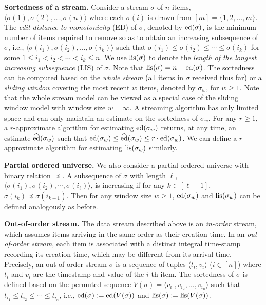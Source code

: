 \documentclass{llncs}
\newcommand{\runtitle}[1]{{\small \textbf{\boldmath #1}}}
\newcommand{\ed}{{\rm ed}}
\newcommand{\aed}{\widehat \ed}
\newcommand{\lis}{{\rm lis}}
\newcommand{\sw}{\sigma_w}
\begin{document}
\runtitle{Sortedness of a stream.}
Consider a stream $\sigma$ of $n$ items,
$\langle \sigma(1), \sigma(2), \dots, \sigma(n) \rangle$
where each $\sigma(i)$ is drawn
from $[m] = \{1, 2, \dots, m\}$.
The \emph{edit distance to monotonicity} (ED) of $\sigma$,
denoted by $\ed(\sigma)$,
is the minimum number of items required
to remove so as to obtain an increasing subsequence of $\sigma$,
i.e., $\langle \sigma(i_1), \sigma(i_2), \dots, \sigma(i_k) \rangle$
such that $\sigma(i_1) \le \sigma(i_2) \le \cdots \le \sigma(i_k)$
for some $1 \le i_1 < i_2 < \cdots < i_k \le n$.
We use $\lis(\sigma)$ to denote the
\emph{length of the longest increasing subsequence} (LIS) of $\sigma$.
Note that $\lis(\sigma) = n - \ed(\sigma)$.
The sortedness can be computed based
on the \emph{whole stream} (all items in $\sigma$ received thus far)
or a \emph{sliding window} covering the most recent $w$ items,
denoted by $\sw$, for $w \ge 1$.
Note that the whole stream model can be viewed as
a special case of the sliding window model with window size $w = \infty$.
A streaming algorithm has only limited space
and can only maintain an estimate on
the sortedness of $\sw$.
For any $r \ge 1$,
a $r$-approximate algorithm for estimating $\ed(\sw)$
returns, at any time,
an estimate $\aed(\sw)$
such that $\ed(\sw) \le \aed(\sw) \le r \cdot \ed(\sw)$.
We can define a $r$-approximate algorithm
for estimating $\lis(\sw)$ similarly.

\runtitle{Partial ordered universe.}
We also consider a partial ordered universe
with binary relation $\preceq$.
A subsequence of $\sigma$ with length $\ell$,
$\langle \sigma(i_1), \sigma(i_2), \cdots, \sigma(i_\ell) \rangle$,
is increasing
if for any $k \in [\ell-1]$, $\sigma(i_k) \preceq \sigma(i_{k+1})$.
Then for any window size $w \ge 1$,
$\ed(\sw)$ and $\lis(\sw)$ can be defined analogously as before.

\runtitle{Out-of-order stream.}
The data stream described above is an \emph{in-order} stream,
which assumes items arriving in the same order as their creation time.
In an \emph{out-of-order stream},
each item is associated with a distinct integral time-stamp recording
its creation time, which may be different from its arrival time.
Precisely, an out-of-order stream $\sigma$
is a sequence of tuples $\langle t_i, v_i\rangle$ ($i \in [n]$)
where $t_i$ and $v_i$ are the timestamp and value of the $i$-th item.
The sortedness of $\sigma$ is defined based on the permuted sequence
$V(\sigma) = \langle v_{i_1}, v_{i_2}, \dots, v_{i_n} \rangle$
such that $t_{i_1} \le t_{i_2} \le \cdots \le t_{i_n}$, i.e.,
$\ed(\sigma) := \ed(V(\sigma))$ and $\lis(\sigma) := \lis(V(\sigma))$.
\end{document}

